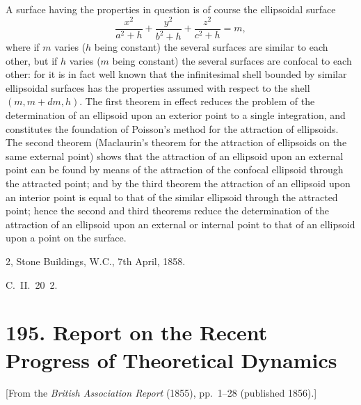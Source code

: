 \documentclass[12pt,a4paper]{article}
\theoremstyle{definition}
\begin{document}
A surface having the properties in question is of course the ellipsoidal surface
\[
\frac{x^2}{a^2+h} + \frac{y^2}{b^2+h} + \frac{z^2}{c^2+h} = m,
\]
where if $m$ varies ($h$ being constant) the several surfaces are similar to each other,
but if $h$ varies ($m$ being constant) the several surfaces are confocal to each other: for
it is in fact well known that the infinitesimal shell bounded by similar ellipsoidal
surfaces has the properties assumed with respect to the shell $(m, m + dm, h)$. The
first theorem in effect reduces the problem of the determination of an ellipsoid upon
an exterior point to a single integration, and constitutes the foundation of Poisson's
method for the attraction of ellipsoids. The second theorem (Maclaurin's theorem for
the attraction of ellipsoids on the same external point) shows that the attraction of
an ellipsoid upon an external point can be found by means of the attraction of the
confocal ellipsoid through the attracted point; and by the third theorem the attraction
of an ellipsoid upon an interior point is equal to that of the similar ellipsoid through
the attracted point; hence the second and third theorems reduce the determination
of the attraction of an ellipsoid upon an external or internal point to that of an
ellipsoid upon a point on the surface.

\hfill 2, Stone Buildings, W.C., 7th April, 1858.

\hfill C.~II.~20~2.

\newpage


\section*{195. Report on the Recent Progress of Theoretical Dynamics}

\begin{center}
[From the \textit{British Association Report} (1855), pp.~1--28 (published 1856).]
\end{center}

\bigskip


\end{document}
